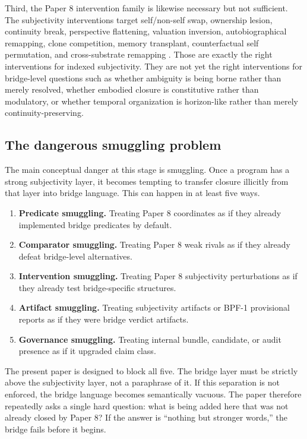 \documentclass[11pt,a4paper]{article}
\theoremstyle{definition}
\begin{document}
Third, the Paper 8 intervention family is likewise necessary but not sufficient. The subjectivity interventions target self/non-self swap, ownership lesion, continuity break, perspective flattening, valuation inversion, autobiographical remapping, clone competition, memory transplant, counterfactual self permutation, and cross-substrate remapping \cite{paper8}. Those are exactly the right interventions for indexed subjectivity. They are not yet the right interventions for bridge-level questions such as whether ambiguity is being borne rather than merely resolved, whether embodied closure is constitutive rather than modulatory, or whether temporal organization is horizon-like rather than merely continuity-preserving.

\subsection{The dangerous smuggling problem}
The main conceptual danger at this stage is smuggling. Once a program has a strong subjectivity layer, it becomes tempting to transfer closure illicitly from that layer into bridge language. This can happen in at least five ways.
\begin{enumerate}[leftmargin=1.5em]
\item \textbf{Predicate smuggling.} Treating Paper 8 coordinates as if they already implemented bridge predicates by default.
\item \textbf{Comparator smuggling.} Treating Paper 8 weak rivals as if they already defeat bridge-level alternatives.
\item \textbf{Intervention smuggling.} Treating Paper 8 subjectivity perturbations as if they already test bridge-specific structures.
\item \textbf{Artifact smuggling.} Treating subjectivity artifacts or BPF-1 provisional reports as if they were bridge verdict artifacts.
\item \textbf{Governance smuggling.} Treating internal bundle, candidate, or audit presence as if it upgraded claim class.
\end{enumerate}

The present paper is designed to block all five. The bridge layer must be strictly above the subjectivity layer, not a paraphrase of it. If this separation is not enforced, the bridge language becomes semantically vacuous. The paper therefore repeatedly asks a single hard question: what is being added here that was not already closed by Paper 8? If the answer is ``nothing but stronger words,'' the bridge fails before it begins.
\end{document}
